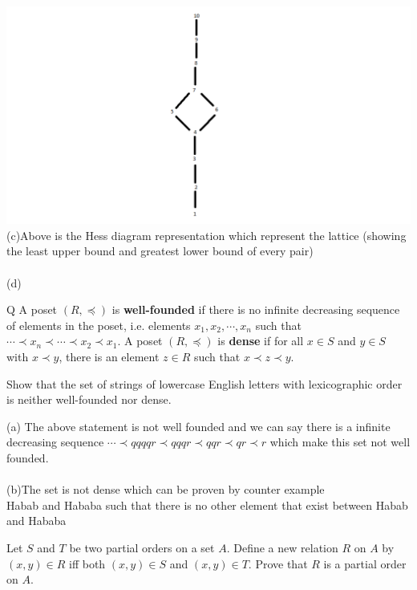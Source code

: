 \documentclass[addpoints]{exam}
\begin{document}
\begin{questions}
\begin{solution}
    \includegraphics[scale=0.5]{discrete.png}\\
    (c)Above is the Hess diagram representation which represent the lattice (showing the least upper bound and greatest lower bound of every pair)\\
    \\
    (d)
     \end{solution}
 Q  
\question 
A poset $(R, \preccurlyeq)$ is \textbf{well-founded} if there is no infinite decreasing sequence of elements in the poset, i.e. elements $x_1, x_2, \cdots, x_n$ such that $\cdots \prec x_n \prec \cdots  \prec x_2 \prec x_1$. A poset $(R, \preccurlyeq)$ is \textbf{dense} if for all $x \in S$ and $y \in S$ with $x \prec y$, there is an element $z \in R$ such that $x \prec z \prec y$.

Show that the set of strings of lowercase English letters with lexicographic order is neither well-founded nor dense.


  \begin{solution}
  (a) The above statement is not well founded and we can say there is a infinite decreasing sequence $\cdots \prec qqqqr  \prec qqqr \prec qqr  \prec qr \prec r$ which make this set not well founded.\\
 \\
 (b)The set is not dense which can be proven by counter example\\
 Habab and Hababa such that there is no other element that exist between Habab and Hababa\\
  \end{solution}

\question
     Let $S$ and $T$ be two partial orders on a set $A$. Define a new relation $R$ on $A$ by $(x,y)\in R$ iff both $(x,y) \in S$ and $(x,y) \in T$. Prove that $R$ is a partial order on $A$.


\end{questions}
\end{document}
